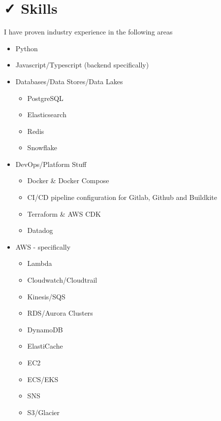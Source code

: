 \documentclass{resume}
\begin{document}
\section{{\faCheck} Skills}
I have proven industry experience in the following areas \\
\bigskip
\begin{minipage}[t]{0.3\textwidth}
  \begin{itemize}
    \item Python
    \item Javascript/Typescript (backend specifically)
    \item Databases/Data Stores/Data Lakes
    \begin{itemize}
      \item PostgreSQL
      \item Elasticsearch
      \item Redis
      \item Snowflake
    \end{itemize}
  \end{itemize}
\end{minipage}
\begin{minipage}[t]{0.3\textwidth}
  \begin{itemize}
    \item DevOps/Platform Stuff
    \begin{itemize}
      \item Docker \& Docker Compose
      \item CI/CD pipeline configuration for Gitlab, Github and Buildkite
      \item Terraform \& AWS CDK
      \item Datadog
    \end{itemize}
  \end{itemize}
\end{minipage}
\begin{minipage}[t]{0.3\textwidth}
  \begin{itemize}
    \item AWS - specifically
    \begin{itemize}
      \item Lambda
      \item Cloudwatch/Cloudtrail
      \item Kinesis/SQS
      \item RDS/Aurora Clusters
      \item DynamoDB
      \item ElastiCache
      \item EC2
      \item ECS/EKS
      \item SNS
      \item S3/Glacier
    \end{itemize}
  \end{itemize}
\end{minipage}
\end{document}
